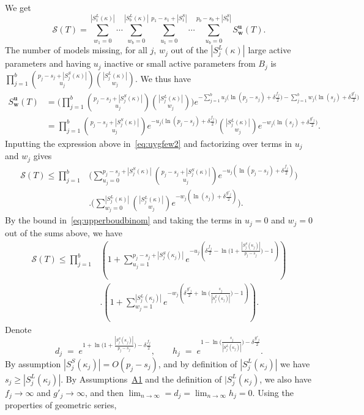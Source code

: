 \documentclass[
  12pt]{article}
\newcommand{\bu}{\mathbf{u}}
\newcommand{\bw}{\mathbf{w}}
\begin{document}
We get
\begin{equation}\label{eq:uygfew2}
    \mathcal{S}(T)=\sum_{w_1=0}^{|S^L_1(\kappa)|}\cdots\sum_{w_b=0}^{|S^L_b(\kappa)|}\sum_{u_1=0}^{p_1-s_1+|S_1^S|}\cdots\sum_{u_b=0}^{p_b-s_b+|S_b^S|}S^{\bu}_{\bw}(T).
\end{equation}
The number of models missing, for all $j$, $w_j$ out of the $|S^L_j(\kappa)|$ large active parameters and having $u_j$ inactive or small active parameters from $B_j$ is $\prod_{j=1}^b {\binom{p_j-s_j+|S^S_j(\kappa)|}{u_j}}{\binom{|S^L_j(\kappa)|}{w_j}}$. We thus have
\begin{align*}
    S^{\bu}_{\bw}(T)&= \bigg(\prod_{j=1}^b {\binom{p_j-s_j+|S^S_j(\kappa)|}{u_j}}{\binom{|S^L_j(\kappa)|}{w_j}}\bigg)e^{- \sum_{j=1}^b u_j\big(\ln(p_j-s_j)+\delta \tfrac{f_j}{2}\big)-\sum_{j=1}^b w_j\big(\ln(s_j)+\delta \tfrac{g'_j}{2}\big)} \\
    &= \prod_{j=1}^b {\binom{p_j-s_j+|S^S_j(\kappa)|}{u_j}}e^{- u_j\big(\ln(p_j-s_j)+\delta \tfrac{f_j}{2}\big)}{\binom{|S^L_j(\kappa)|}{w_j}}e^{-w_j\big(\ln(s_j)+\delta \tfrac{g'_j}{2}\big)}.
\end{align*}
Inputting the expression above in~\eqref{eq:uygfew2} and factorizing over terms in $u_j$ and $w_j$ gives
\begin{align*}
    \mathcal{S}(T)\leq\prod_{j=1}^b & \Bigg(\sum_{u_j=0}^{p_j-s_j+|S^S_j(\kappa)|}{\binom{p_j-s_j+|S^S_j(\kappa)|}{u_j}}e^{- u_j(\ln(p_j-s_j)+\delta \tfrac{f_j}{2})}\Bigg)\\&.\Bigg(
    \sum_{w_j=0}^{|S^L_j(\kappa)|}{\binom{|S^L_j(\kappa)|}{w_j}}
    e^{-w_j(\ln(s_j)+\delta \tfrac{g'_j}{2})}\Bigg).
\end{align*}
By the bound in~\eqref{eq:upperboudbinom} and taking the terms in $u_j=0$ and $w_j=0$ out of the sums above, %
we have
\begin{align}\label{eq:ogr}
    \mathcal{S}(T)\leq\prod_{j=1}^b & \left(1+\sum_{u_j=1}^{p_j-s_j+|S_j^{S}(\kappa_j)|}e^{-u_j\left(\delta \tfrac{f_j}{2}-\ln\big(1+\frac{|S_j^{S}(\kappa_j)|}{p_j-s_j}\big)-1\right)}\right)\\&.\left(1+
    \sum_{w_j=1}^{|S_j^{L}(\kappa_j)|}    e^{-w_j\left(\delta \tfrac{g'_j}{2}+\ln\big(\frac{s_j}{|S_j^{L}(\kappa_j)|}\big)-1\right)}\right).\nonumber
\end{align}
Denote
$$
d_j\;=\;e^{1+\ln\big(1+\frac{|S_j^{S}(\kappa_j)|}{p_j-s_j}\big)-\delta \tfrac{f_j}{2}},\qquad h_j\;=\;e^{1-\ln\big(\frac{s_j}{|S_j^{L}(\kappa_j)|}\big)-\delta \tfrac{g'_j}{2}}.
$$
By assumption $|S_j^{S}(\kappa_j)|=O(p_j-s_j)$, and by definition of $|S_j^{L}(\kappa_j)|$ we have $s_j\geq|S_j^{L}(\kappa_j)|$. By Assumptions~\hyperlink{lab:A1}{A1} and the definition of $|S_j^{L}(\kappa_j)$, we also have $f_j\to\infty$ and $g'_j\to\infty$, and then $\lim_{n \to \infty}= d_j= \lim_{n \to \infty} h_j=0$. Using the properties of geometric series, 
\end{document}
